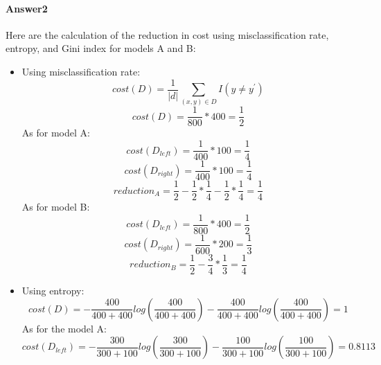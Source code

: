 \documentclass[paper=a4, fontsize=11pt]{scrartcl} %
\numberwithin{equation}{section} %
\numberwithin{figure}{section} %
\numberwithin{table}{section} %
\begin{document}
\paragraph{\textbf{Answer2}}
Here are the calculation of the reduction in cost using misclassification rate, entropy, and Gini index for models A and B:
\begin{itemize}
	\item Using misclassification rate:
		\begin{equation*}
		cost\left ( D \right )=\frac{1}{\left | d \right |}\sum_{\left ( x,y \right )\in D}I\left ( y\neq y^{'} \right )
		\end{equation*}
		\begin{equation*}
		cost\left ( D \right )=\frac{1}{800}*400=\frac{1}{2}
		\end{equation*}
		As for model A:
		\begin{equation*}
		cost\left ( D_{left} \right )=\frac{1}{400}*100=\frac{1}{4}
		\end{equation*}
		\begin{equation*}
		cost\left ( D_{right} \right )=\frac{1}{400}*100=\frac{1}{4}
		\end{equation*}
		\begin{equation*}
		reduction_{A}=\frac{1}{2}-\frac{1}{2}*\frac{1}{4}-\frac{1}{2}*\frac{1}{4}=\frac{1}{4}
		\end{equation*}
		As for model B:
		\begin{equation*}
		cost\left ( D_{left} \right )=\frac{1}{800}*400=\frac{1}{2}
		\end{equation*}
		\begin{equation*}
		cost\left ( D_{right} \right )=\frac{1}{600}*200=\frac{1}{3}
		\end{equation*}
		\begin{equation*}
		reduction_{B}=\frac{1}{2}-\frac{3}{4}*\frac{1}{3}=\frac{1}{4}
		\end{equation*}
	\item Using entropy:
		\begin{equation*}
		cost\left ( D \right )=-\frac{400}{400+400}log\left ( \frac{400}{400+400} \right )-\frac{400}{400+400}log\left ( \frac{400}{400+400} \right )=1
		\end{equation*}
		As for the model A:
		\begin{equation*}
		cost\left ( D_{left} \right )=-\frac{300}{300+100}log\left ( \frac{300}{300+100} \right )-\frac{100}{300+100}log\left ( \frac{100}{300+100} \right )=0.8113
		\end{equation*}

\end{itemize}
\end{document}
